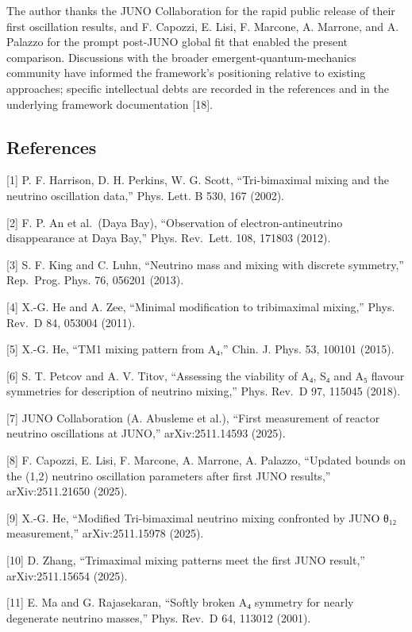 \documentclass[
  11pt,
  letterpaper,
]{article}
\begin{document}
The author thanks the JUNO Collaboration for the rapid public release of
their first oscillation results, and F. Capozzi, E. Lisi, F. Marcone, A.
Marrone, and A. Palazzo for the prompt post-JUNO global fit that enabled
the present comparison. Discussions with the broader
emergent-quantum-mechanics community have informed the framework's
positioning relative to existing approaches; specific intellectual debts
are recorded in the references and in the underlying framework
documentation {[}18{]}.

\hypertarget{references}{%
\subsection{References}\label{references}}

{[}1{]} P. F. Harrison, D. H. Perkins, W. G. Scott, ``Tri-bimaximal
mixing and the neutrino oscillation data,'' Phys. Lett. B 530, 167
(2002).

{[}2{]} F. P. An et al.~(Daya Bay), ``Observation of
electron-antineutrino disappearance at Daya Bay,'' Phys. Rev.~Lett. 108,
171803 (2012).

{[}3{]} S. F. King and C. Luhn, ``Neutrino mass and mixing with discrete
symmetry,'' Rep.~Prog. Phys. 76, 056201 (2013).

{[}4{]} X.-G. He and A. Zee, ``Minimal modification to tribimaximal
mixing,'' Phys. Rev.~D 84, 053004 (2011).

{[}5{]} X.-G. He, ``TM1 mixing pattern from A₄,'' Chin. J. Phys. 53,
100101 (2015).

{[}6{]} S. T. Petcov and A. V. Titov, ``Assessing the viability of A₄,
S₄ and A₅ flavour symmetries for description of neutrino mixing,'' Phys.
Rev.~D 97, 115045 (2018).

{[}7{]} JUNO Collaboration (A. Abusleme et al.), ``First measurement of
reactor neutrino oscillations at JUNO,'' arXiv:2511.14593 (2025).

{[}8{]} F. Capozzi, E. Lisi, F. Marcone, A. Marrone, A. Palazzo,
``Updated bounds on the (1,2) neutrino oscillation parameters after
first JUNO results,'' arXiv:2511.21650 (2025).

{[}9{]} X.-G. He, ``Modified Tri-bimaximal neutrino mixing confronted by
JUNO θ₁₂ measurement,'' arXiv:2511.15978 (2025).

{[}10{]} D. Zhang, ``Trimaximal mixing patterns meet the first JUNO
result,'' arXiv:2511.15654 (2025).

{[}11{]} E. Ma and G. Rajasekaran, ``Softly broken A₄ symmetry for
nearly degenerate neutrino masses,'' Phys. Rev.~D 64, 113012 (2001).
\end{document}
